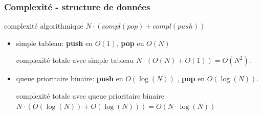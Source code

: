 \documentclass[]{beamer}
\begin{document}
\begin{frame}
  \frametitle{Complexité - structure de données}
  \begin{block}{complexité algorithmique}
  $N \cdot \left( compl(pop) + compl(push)\right)$
  \end{block}
  \begin{itemize}
  \item simple tableau:
  \textbf {push} en $O(1)$, \textbf {pop} en $O(N)$
  \begin{block}{complexité totale avec simple tableau}
  $N \cdot \left( O(N) + O(1) \right) = O(N^2)$. 
  \end{block}
  \item queue prioritaire binaire:
  \textbf {push} en $O(\log(N))$ ,  \textbf {pop} en $O(\log(N))$.
  \begin{block}{complexité totale avec queue prioritaire binaire}
  $N \cdot \left( O(\log(N)) + O(\log(N)) \right) = O\left(N \cdot \log(N)\right)$
  \end{block}
  \end{itemize}
\end{frame}
\end{document}

